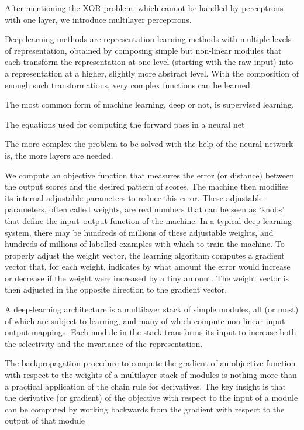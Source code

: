 After mentioning the XOR problem, which cannot be handled by perceptrons with one layer, we introduce multilayer perceptrons. 


Deep-learning methods are representation-learning methods with multiple levels of representation, obtained by composing simple but non-linear modules that each transform the representation at one level (starting with the raw input) into a representation at a higher, slightly more abstract level. With the composition of enough such transformations, very complex functions can be learned.

The most common form of machine learning, deep or not, is supervised learning.

The equations used for computing the forward pass in a neural net



The more complex the problem to be solved with the help of the neural network is, the more layers are needed. 

We compute an objective function that measures the error (or distance) between the output scores and the desired pattern of scores. The machine then modifies its internal adjustable parameters to reduce  this error. These adjustable parameters, often called weights, are real numbers that can be seen as ‘knobs’ that define the input–output function of the machine. In a typical deep-learning system, there may be hundreds of millions of these adjustable weights, and hundreds of millions of labelled examples with which to train the machine. To properly adjust the weight vector, the learning algorithm computes a gradient vector that, for each weight, indicates by what amount the error would increase or decrease if the weight were increased by a tiny amount. The weight vector is then adjusted in the opposite direction to the gradient vector. 

A deep-learning architecture is a multilayer stack of simple modules, all (or most) of which are subject to learning, and many of which compute non-linear input–output mappings. Each module in the stack transforms its input to increase both the selectivity and the invariance of the representation.

The backpropagation procedure to compute the gradient of an objective function with respect to the weights of a multilayer stack of modules is nothing more than a practical application of the chain rule for derivatives. The key insight is that the derivative (or gradient) of the objective with respect to the input of a module can be computed by working backwards from the gradient with respect to the output of that module

